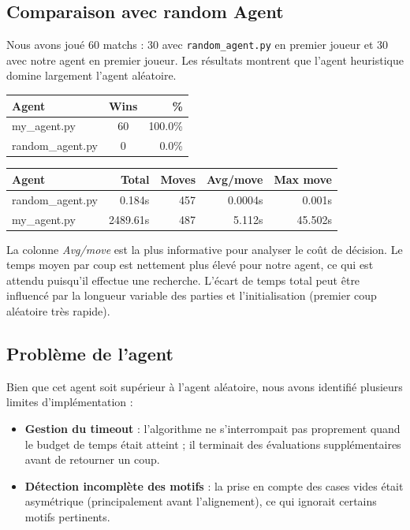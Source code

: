 \subsection{Comparaison avec random Agent}
Nous avons joué 60 matchs : 30 avec \texttt{random\_agent.py} en premier joueur et 30 avec notre agent en premier joueur. Les résultats montrent que l'agent heuristique domine largement l'agent aléatoire.\\

\begin{tabular}{|l|c|r|}
    \hline
    Agent & Wins & \% \\
    \hline
    my\_agent.py & 60 & 100.0\% \\
    random\_agent.py & 0 & 0.0\% \\
    \hline 
\end{tabular}
\begin{tabular}{|l|r|r|r|r|}
    \hline
    Agent & Total & Moves & Avg/move & Max move \\
    \hline
    random\_agent.py & 0.184s & 457 & 0.0004s & 0.001s \\
    my\_agent.py & 2489.61s & 487 & 5.112s & 45.502s \\
    \hline
\end{tabular}

\bigskip
La colonne \textit{Avg/move} est la plus informative pour analyser le coût de décision. Le temps moyen par coup est nettement plus élevé pour notre agent, ce qui est attendu puisqu'il effectue une recherche. L'écart de temps total peut être influencé par la longueur variable des parties et l'initialisation (premier coup aléatoire très rapide).

\subsection{Problème de l'agent}
Bien que cet agent soit supérieur à l'agent aléatoire, nous avons identifié plusieurs limites d'implémentation :\\

\begin{itemize}
    \item \textbf{Gestion du timeout} : l'algorithme ne s'interrompait pas proprement quand le budget de temps était atteint ; il terminait des évaluations supplémentaires avant de retourner un coup.

    \item \textbf{Détection incomplète des motifs} : la prise en compte des cases vides était asymétrique (principalement avant l'alignement), ce qui ignorait certains motifs pertinents.
\end{itemize}

